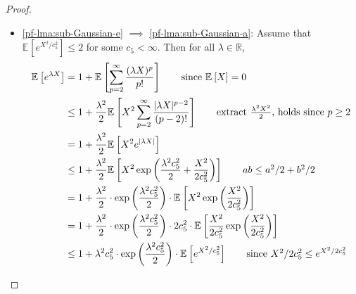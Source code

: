 \begin{proof}
\begin{itemize}
		\item \autoref{pf-lma:sub-Gaussian-e} \(\implies \) \autoref{pf-lma:sub-Gaussian-a}: Assume that \(\mathbb{E}_{}\left[e^{X^2 / c_5^2} \right] \leq 2\) for some \(c_5 < \infty \). Then for all \(\lambda \in \mathbb{R} \),
		      \begin{align*}
			      \mathbb{E}_{}\left[e^{\lambda X} \right]
			       & = 1 + \mathbb{E}_{}\left[\sum_{p=2}^{\infty} \frac{(\lambda X)^p}{p!} \right] \tag*{since \(\mathbb{E}_{}\left[X \right] = 0\)}                                                                                                                                                                          \\
			       & \leq 1 + \frac{\lambda ^2}{2} \mathbb{E}_{}\left[ X^2 \sum_{p=2}^{\infty} \frac{\vert \lambda X \vert ^{p-2}}{(p-2)!} \right] \tag*{extract \(\frac{\lambda ^2 X^2}{2}\), holds since \(p \geq 2\)}                                                                                                      \\
			       & = 1 + \frac{\lambda ^2}{2} \mathbb{E}_{}\left[X^2 e^{\vert \lambda X \vert } \right]                                                                                                                                                                                                                     \\
			       & \leq 1 + \frac{\lambda ^2}{2} \mathbb{E}_{}\left[X^2 \exp \left( \frac{\lambda ^2 c_5^2}{2} + \frac{X^2}{2 c_5^2} \right) \right]                                                                                                                                   \tag*{\(ab \leq a^2 / 2 + b^2 / 2\)} \\
			       & = 1 + \frac{\lambda ^2}{2} \cdot \exp \left( \frac{\lambda ^2 c_5^2}{2} \right)\cdot \mathbb{E}_{}\left[X^2 \exp \left( \frac{X^2}{2c_5^2} \right)\right]                                                                                                                                                \\
			       & = 1 + \frac{\lambda ^2}{2} \cdot \exp \left( \frac{\lambda ^2 c_5^2}{2} \right)\cdot 2c_5^2 \cdot \mathbb{E}_{}\left[\frac{X^2}{2c_5^2}\exp \left( \frac{X^2}{2c_5^2} \right)\right]                                                                                                                     \\
			       & \leq 1 + \lambda ^2 c_5^2 \cdot \exp \left( \frac{\lambda ^2 c_5^2}{2} \right) \cdot \mathbb{E}_{}\left[e^{X^2 / c_5^2 } \right] \tag*{since \(X^2 / 2c_5^2 \leq e^{X^2 / 2c_5^2}\)}                                                                                                                     \\

\end{align*}
\end{itemize}
\end{proof}
